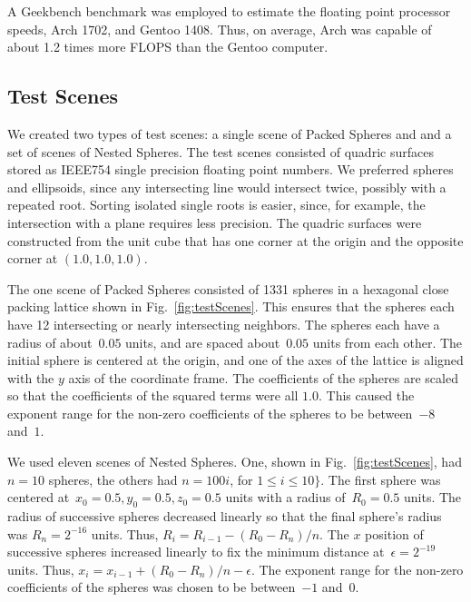 \documentclass{cccg16}
\begin{document}
A Geekbench benchmark was employed to estimate the floating point
processor speeds, Arch 1702, and Gentoo 1408. Thus, on average, Arch
was capable of about 1.2 times more FLOPS than the Gentoo computer.


\subsection{Test Scenes}
We created two types of test scenes: a single scene of Packed Spheres
and and a set of scenes of Nested Spheres.  The test scenes consisted
of quadric surfaces stored as IEEE754 single precision floating point
numbers.  We preferred spheres and ellipsoids, since any intersecting
line would intersect twice, possibly with a repeated root.  Sorting
isolated single roots is easier, since, for example, the intersection
with a plane requires less precision. The quadric surfaces were
constructed from the unit cube that has one corner at the origin and
the opposite corner at $(1.0, 1.0, 1.0)$.

The one scene of Packed Spheres consisted of 1331 spheres in a
hexagonal close packing lattice shown in Fig.~\ref{fig:testScenes}.
This ensures that the spheres each have 12 intersecting or nearly
intersecting neighbors.  The spheres each have a radius of
about~$0.05$ units, and are spaced about~$0.05$ units from each other.
The initial sphere is centered at the origin, and one of the axes of
the lattice is aligned with the $y$ axis of the coordinate frame.  The
coefficients of the spheres are scaled so that the coefficients of the
squared terms were all $1.0$. This caused the exponent range for the
non-zero coefficients of the spheres to be between~$-8$ and~$1$.

We used eleven scenes of Nested Spheres. One, shown in
Fig.~\ref{fig:testScenes}, had $n=10$ spheres, the others had
$n=100i$, for $1\leq i \leq 10\}$.  The first sphere was centered
at~$x_0=0.5, y_0=0.5, z_0=0.5$ units with a radius of~$R_0=0.5$ units.
The radius of successive spheres decreased linearly so that the final
sphere's radius was $R_n=2^{-16}$ units.  Thus,
$R_i=R_{i-1}-(R_0-R_n)/n$.  The $x$ position of successive spheres
increased linearly to fix the minimum distance at~$\epsilon=2^{-19}$
units. Thus, $x_i=x_{i-1}+(R_0-R_n)/n-\epsilon$.  The exponent range
for the non-zero coefficients of the spheres was chosen to be
between~$-1$ and~$0$.
\end{document}

